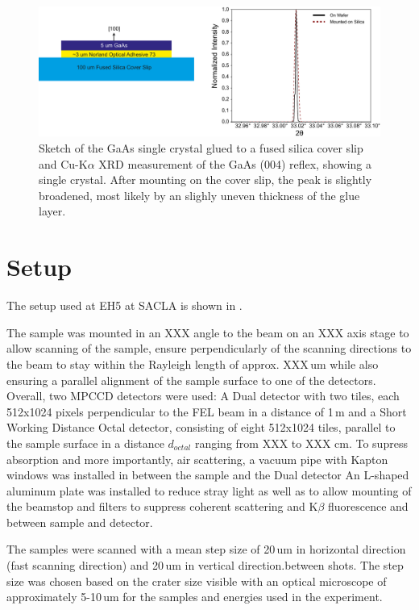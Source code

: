 \begin{figure}[tp]
	\centering
	\includegraphics[width=0.8\linewidth]{images/gaas_sample.pdf}
	\caption[GaAs Sample]{Sketch of the GaAs single crystal glued to a fused silica cover slip and Cu-K$\alpha$ XRD measurement of the GaAs (004) reflex, showing a single crystal. After mounting on the cover slip, the peak is slightly broadened, most likely by an slighly uneven thickness of the glue layer. }
	\label{fig:gaas_sample}
\end{figure}


\section{Setup}
The setup used at EH5 at SACLA is shown in . 

The sample was mounted in an XXX angle to the beam on an XXX axis stage to allow scanning of the sample, ensure perpendicularly of the scanning directions to the beam to stay within the Rayleigh length of approx. XXX\,um while also ensuring a parallel alignment of the sample surface to one of the detectors. Overall, two MPCCD detectors were used: A Dual detector with two tiles, each 512x1024 pixels perpendicular to the FEL beam in a distance of 1\,m and a Short Working Distance Octal detector, consisting of eight 512x1024 tiles, parallel to the sample surface in a distance $d_{octal}$ ranging from XXX to XXX cm. To supress absorption and more importantly, air scattering, a vacuum pipe with Kapton windows was installed in between the sample and the Dual detector
An L-shaped aluminum plate was installed to reduce stray light as well as to allow mounting of the beamstop and filters to suppress coherent scattering and K$\beta$ fluorescence and between sample and detector.

The samples were scanned with a mean step size of 20\,um in horizontal direction (fast scanning direction) and 20\,um in vertical direction.between shots. The step size was chosen based on the crater size visible with an optical microscope of approximately 5-10\,um for the samples and energies used in the experiment.

